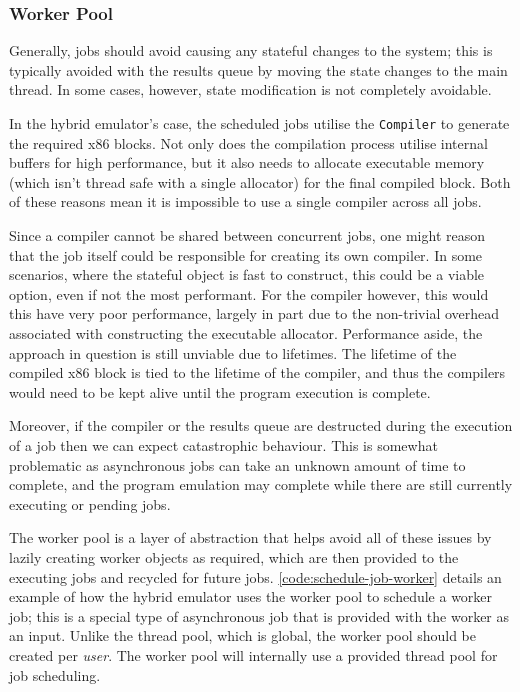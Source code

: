 \subsubsection{Worker Pool}

Generally, jobs should avoid causing any stateful changes to the system; this is typically avoided with the results queue by moving the state changes to the main thread. In some cases, however, state modification is not completely avoidable.

In the hybrid emulator's case, the scheduled jobs utilise the \texttt{Compiler} to generate the required x86 blocks. Not only does the compilation process utilise internal buffers for high performance, but it also needs to allocate executable memory (which isn't thread safe with a single allocator) for the final compiled block. Both of these reasons mean it is impossible to use a single compiler across all jobs.

Since a compiler cannot be shared between concurrent jobs, one might reason that the job itself could be responsible for creating its own compiler. In some scenarios, where the stateful object is fast to construct, this could be a viable option, even if not the most performant. For the compiler however, this would this have very poor performance, largely in part due to the non-trivial overhead associated with constructing the executable allocator. Performance aside, the approach in question is still unviable due to lifetimes. The lifetime of the compiled x86 block is tied to the lifetime of the compiler, and thus the compilers would need to be kept alive until the program execution is complete.

Moreover, if the compiler or the results queue are destructed during the execution of a job then we can expect catastrophic behaviour. This is somewhat problematic as asynchronous jobs can take an unknown amount of time to complete, and the program emulation may complete while there are still currently executing or pending jobs.

The worker pool is a layer of abstraction that helps avoid all of these issues by lazily creating worker objects as required, which are then provided to the executing jobs and recycled for future jobs. \autoref{code:schedule-job-worker} details an example of how the hybrid emulator uses the worker pool to schedule a worker job; this is a special type of asynchronous job that is provided with the worker as an input. Unlike the thread pool, which is global, the worker pool should be created per \textit{user}. The worker pool will internally use a provided thread pool for job scheduling.

